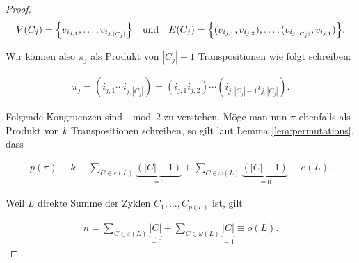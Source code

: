 \begin{proof}
                \begin{align*}
                    V(C_j) = {\left \{ v_{i_{j, 1}}, \dots, v_{i_{j, |C_j|}} \right \}}
                    \quad
                    \text{und}
                    \quad
                    E(C_j) = {\left \{ (v_{i_{j, 1}}, v_{i_{j, 2}}), \dots, (v_{i_{j, |C_j|}}, v_{i_{j, 1}}) \right \}}.
                \end{align*}

                Wir können also $\pi_j$ als Produkt von $|C_j| - 1$ Transpositionen wie folgt schreiben:

                \begin{align*}
                    \pi_j
                    =
                    (i_{j, 1} \cdots i_{j, |C_j|})
                    =
                    (i_{j, 1} i_{j, 2}) \cdots (i_{j, |C_j|-1} i_{j, |C_j|}).
                \end{align*}

                Folgende Kongruenzen sind $\mod 2$ zu verstehen.
                Möge man nun $\pi$ ebenfalls als Produkt von $k$ Transpositionen schreiben, so gilt laut Lemma \ref{lem:permutations}, dass

                \begin{align} \label{eq:mod_1}
                    p(\pi)
                    \equiv
                    k
                    \equiv
                    \sum_{C \in \varepsilon(L)}
                        \underbrace
                        {
                            (|C| - 1)
                        }_{
                            \equiv 1
                        }
                    +
                    \sum_{C \in \omega(L)}
                        \underbrace
                        {
                            (|C| - 1)
                        }_{
                            \equiv 0
                        }
                    \equiv
                    e(L).
                \end{align}

                Weil $L$ direkte Summe der Zyklen $C_1, \dots, C_{p(L)}$ ist, gilt

                \begin{align} \label{eq:mod_2}
                    n
                    =
                    \sum_{C \in \varepsilon(L)} \underbrace{|C|}_{\equiv 0}
                    +
                    \sum_{C \in \omega(L)} \underbrace{|C|}_{\equiv 1}
                    \equiv
                    o(L).
                \end{align}


\end{proof}
